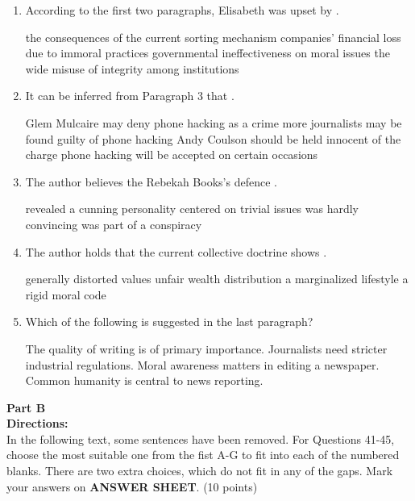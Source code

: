 \begin{enumerate}[resume]
	\item
According to the first two paragraphs, Elisabeth was upset
by \lineread.


\fourchoices
{the consequences of the current sorting mechanism}
{companies' financial loss due to immoral practices}
{governmental ineffectiveness on moral issues}
{the wide misuse of integrity among institutions}


\item
It can be inferred from Paragraph 3 that \lineread.

\fourchoices
{Glem Mulcaire may deny phone hacking as a crime}
{more journalists may be found guilty of phone hacking}
{Andy Coulson should be held innocent of the charge}
{phone hacking will be accepted on certain occasions}


\item
The author believes the Rebekah Books's
defence \lineread.


\fourchoices
{revealed a cunning personality}
{centered on trivial issues}
{was hardly convincing}
{was part of a conspiracy}



\item
The author holds that the current collective doctrine
shows \lineread.


\fourchoices
{generally distorted values}
{unfair wealth distribution}
{a marginalized lifestyle}
{a rigid moral code}



\item
Which of the following is suggested in the last paragraph?


\fourchoices
{The quality of writing is of primary importance.}
{Journalists need stricter industrial regulations.}
{Moral awareness matters in editing a newspaper.}
{Common humanity is central to news reporting.}



\end{enumerate}

\newpage
\noindent
\textbf{Part B}\\
\textbf{Directions:}\\
In the following text, some sentences have been removed. For
	Questions 41-45, choose the most suitable one from the fist A-G to fit
	into each of the numbered blanks. There are two extra choices, which do
	not fit in any of the gaps. Mark your answers on \textbf{ANSWER SHEET}. (10 points)


